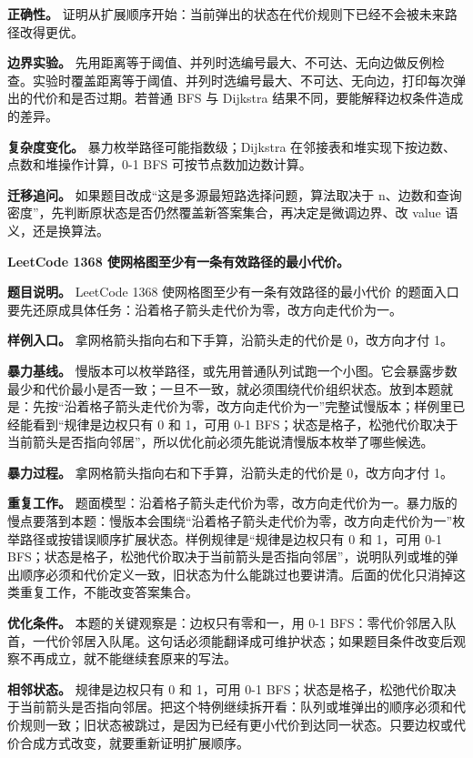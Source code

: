 \textbf{正确性。} 证明从扩展顺序开始：当前弹出的状态在代价规则下已经不会被未来路径改得更优。

\textbf{边界实验。} 先用距离等于阈值、并列时选编号最大、不可达、无向边做反例检查。实验时覆盖距离等于阈值、并列时选编号最大、不可达、无向边，打印每次弹出的代价和是否过期。若普通 BFS 与 Dijkstra 结果不同，要能解释边权条件造成的差异。

\textbf{复杂度变化。} 暴力枚举路径可能指数级；Dijkstra 在邻接表和堆实现下按边数、点数和堆操作计算，0-1 BFS 可按节点数加边数计算。

\textbf{迁移追问。} 如果题目改成“这是多源最短路选择问题，算法取决于 n、边数和查询密度”，先判断原状态是否仍然覆盖新答案集合，再决定是微调边界、改 value 语义，还是换算法。

\noindent\textbf{LeetCode 1368 使网格图至少有一条有效路径的最小代价。}

\textbf{题目说明。} LeetCode 1368 使网格图至少有一条有效路径的最小代价 的题面入口要先还原成具体任务：沿着格子箭头走代价为零，改方向走代价为一。

\textbf{样例入口。} 拿网格箭头指向右和下手算，沿箭头走的代价是 0，改方向才付 1。

\textbf{暴力基线。} 慢版本可以枚举路径，或先用普通队列试跑一个小图。它会暴露步数最少和代价最小是否一致；一旦不一致，就必须围绕代价组织状态。放到本题就是：先按“沿着格子箭头走代价为零，改方向走代价为一”完整试慢版本；样例里已经能看到“规律是边权只有 0 和 1，可用 0-1 BFS；状态是格子，松弛代价取决于当前箭头是否指向邻居”，所以优化前必须先能说清慢版本枚举了哪些候选。

\textbf{暴力过程。} 拿网格箭头指向右和下手算，沿箭头走的代价是 0，改方向才付 1。

\textbf{重复工作。} 题面模型：沿着格子箭头走代价为零，改方向走代价为一。暴力版的慢点要落到本题：慢版本会围绕“沿着格子箭头走代价为零，改方向走代价为一”枚举路径或按错误顺序扩展状态。样例规律是“规律是边权只有 0 和 1，可用 0-1 BFS；状态是格子，松弛代价取决于当前箭头是否指向邻居”，说明队列或堆的弹出顺序必须和代价定义一致，旧状态为什么能跳过也要讲清。后面的优化只消掉这类重复工作，不能改变答案集合。

\textbf{优化条件。} 本题的关键观察是：边权只有零和一，用 0-1 BFS：零代价邻居入队首，一代价邻居入队尾。这句话必须能翻译成可维护状态；如果题目条件改变后观察不再成立，就不能继续套原来的写法。

\textbf{相邻状态。} 规律是边权只有 0 和 1，可用 0-1 BFS；状态是格子，松弛代价取决于当前箭头是否指向邻居。把这个特例继续拆开看：队列或堆弹出的顺序必须和代价规则一致；旧状态被跳过，是因为已经有更小代价到达同一状态。只要边权或代价合成方式改变，就要重新证明扩展顺序。

